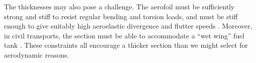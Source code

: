 \documentclass[12pt]{article}
\begin{document}
The thicknesses may also pose a challenge. The aerofoil must be sufficiently strong and stiff to resist regular bending and torsion loads, and must be stiff enough to give suitably high aeroelastic divergence and flutter speeds \cite{aeroelasticity}. Moreover, in civil transports, the section must be able to accommodate a ``wet wing'' fuel tank \cite{aircraftdesign}. These constraints all encourage a thicker section than we might select for aerodynamic reasons.

\printbibliography
\end{document}
